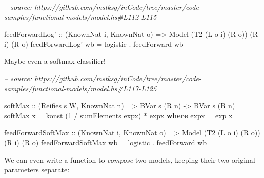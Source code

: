 \documentclass[]{article}
\newenvironment{Shaded}{}{}
\newcommand{\CommentTok}[1]{\textcolor[rgb]{0.38,0.63,0.69}{\textit{#1}}}
\newcommand{\DataTypeTok}[1]{\textcolor[rgb]{0.56,0.13,0.00}{#1}}
\newcommand{\DecValTok}[1]{\textcolor[rgb]{0.25,0.63,0.44}{#1}}
\newcommand{\FunctionTok}[1]{\textcolor[rgb]{0.02,0.16,0.49}{#1}}
\newcommand{\KeywordTok}[1]{\textcolor[rgb]{0.00,0.44,0.13}{\textbf{#1}}}
\newcommand{\NormalTok}[1]{#1}
\newcommand{\OtherTok}[1]{\textcolor[rgb]{0.00,0.44,0.13}{#1}}
\begin{document}
\begin{Shaded}
\begin{Highlighting}[]
\CommentTok{-- source: https://github.com/mstksg/inCode/tree/master/code-samples/functional-models/model.hs#L112-L115}

\NormalTok{feedForwardLog'}
\OtherTok{    ::}\NormalTok{ (}\DataTypeTok{KnownNat}\NormalTok{ i, }\DataTypeTok{KnownNat}\NormalTok{ o)}
    \OtherTok{=>} \DataTypeTok{Model}\NormalTok{ (}\DataTypeTok{T2}\NormalTok{ (}\DataTypeTok{L}\NormalTok{ o i) (}\DataTypeTok{R}\NormalTok{ o)) (}\DataTypeTok{R}\NormalTok{ i) (}\DataTypeTok{R}\NormalTok{ o)}
\NormalTok{feedForwardLog' wb }\FunctionTok{=}\NormalTok{ logistic }\FunctionTok{.}\NormalTok{ feedForward wb}
\end{Highlighting}
\end{Shaded}

Maybe even a softmax classifier!

\begin{Shaded}
\begin{Highlighting}[]
\CommentTok{-- source: https://github.com/mstksg/inCode/tree/master/code-samples/functional-models/model.hs#L117-L125}

\OtherTok{softMax ::}\NormalTok{ (}\DataTypeTok{Reifies}\NormalTok{ s }\DataTypeTok{W}\NormalTok{, }\DataTypeTok{KnownNat}\NormalTok{ n) }\OtherTok{=>} \DataTypeTok{BVar}\NormalTok{ s (}\DataTypeTok{R}\NormalTok{ n) }\OtherTok{->} \DataTypeTok{BVar}\NormalTok{ s (}\DataTypeTok{R}\NormalTok{ n)}
\NormalTok{softMax x }\FunctionTok{=}\NormalTok{ konst (}\DecValTok{1} \FunctionTok{/}\NormalTok{ sumElements expx) }\FunctionTok{*}\NormalTok{ expx}
  \KeywordTok{where}
\NormalTok{    expx }\FunctionTok{=}\NormalTok{ exp x}

\NormalTok{feedForwardSoftMax}
\OtherTok{    ::}\NormalTok{ (}\DataTypeTok{KnownNat}\NormalTok{ i, }\DataTypeTok{KnownNat}\NormalTok{ o)}
    \OtherTok{=>} \DataTypeTok{Model}\NormalTok{ (}\DataTypeTok{T2}\NormalTok{ (}\DataTypeTok{L}\NormalTok{ o i) (}\DataTypeTok{R}\NormalTok{ o)) (}\DataTypeTok{R}\NormalTok{ i) (}\DataTypeTok{R}\NormalTok{ o)}
\NormalTok{feedForwardSoftMax wb }\FunctionTok{=}\NormalTok{ logistic }\FunctionTok{.}\NormalTok{ feedForward wb}
\end{Highlighting}
\end{Shaded}

We can even write a function to \emph{compose} two models, keeping their two
original parameters separate:
\end{document}
